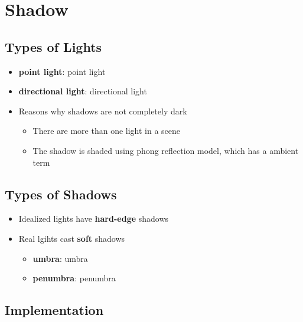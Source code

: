 \chapter{Shadow}

\section{Types of Lights}

  \begin{itemize}
    \item \textbf{\Gls{point light}}: \glsdesc{point light}
    \item \textbf{\Gls{directional light}}: \glsdesc{directional light}
    \item Reasons why shadows are not completely dark
    \begin{itemize}
      \item There are more than one light in a scene
      \item The shadow is shaded using phong reflection model, which has a
      ambient term
    \end{itemize}
  \end{itemize}

\section{Types of Shadows}

  \begin{itemize}
    \item Idealized lights have \textbf{hard-edge} shadows
    \item Real lgihts cast \textbf{soft} shadows
    \begin{itemize}
      \item \textbf{\Gls{umbra}}: \glsdesc{umbra}
      \item \textbf{\Gls{penumbra}}: \glsdesc{penumbra}
    \end{itemize}
  \end{itemize}

\section{Implementation}

